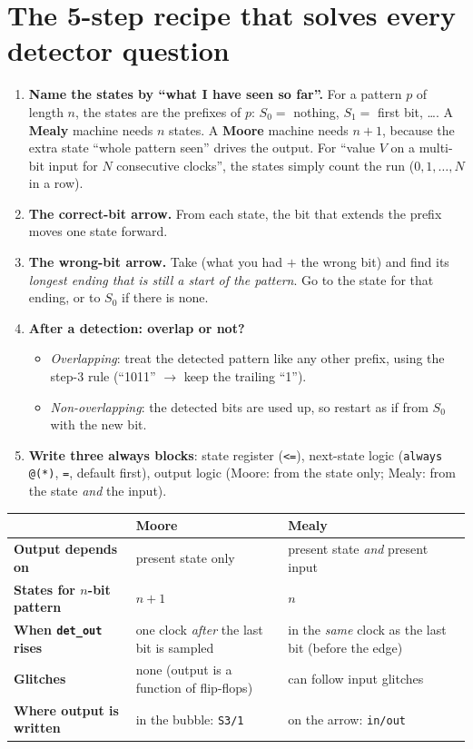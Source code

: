\documentclass[10pt,a4paper]{article}
\begin{document}
\section{The 5-step recipe that solves every detector question}
\begin{enumerate}[leftmargin=*,itemsep=2pt]
\item \textbf{Name the states by ``what I have seen so far''.} For a pattern $p$ of length $n$, the states are
  the prefixes of $p$: $S_0=$ nothing, $S_1=$ first bit, \dots. A \textbf{Mealy} machine needs $n$ states.
  A \textbf{Moore} machine needs $n+1$, because the extra state ``whole pattern seen'' drives the output.
  For ``value $V$ on a multi-bit input for $N$ consecutive clocks'', the states simply count the run
  ($0,1,\dots,N$ in a row).
\item \textbf{The correct-bit arrow.} From each state, the bit that extends the prefix moves one state forward.
\item \textbf{The wrong-bit arrow.} Take (what you had $+$ the wrong bit) and find its \emph{longest ending
  that is still a start of the pattern}. Go to the state for that ending, or to $S_0$ if there is none.
\item \textbf{After a detection: overlap or not?}
  \begin{itemize}[itemsep=0pt]
  \item \emph{Overlapping}: treat the detected pattern like any other prefix, using the step-3 rule
        (``1011'' $\to$ keep the trailing ``1'').
  \item \emph{Non-overlapping}: the detected bits are used up, so restart as if from $S_0$ with
        the new bit.
  \end{itemize}
\item \textbf{Write three always blocks}: state register (\texttt{<=}),
  next-state logic (\texttt{always @(*)}, \texttt{=}, default first),
  output logic (Moore: from the state only; Mealy: from the state \emph{and} the input).
\end{enumerate}

\begin{center}\small
\begin{tabular}{>{\bfseries}p{3.2cm} p{6.2cm} p{6.2cm}}
\toprule
 & Moore & Mealy \\ \midrule
Output depends on & present state only & present state \emph{and} present input \\
States for $n$-bit pattern & $n+1$ & $n$ \\
When \texttt{det\_out} rises & one clock \emph{after} the last bit is sampled & in the \emph{same} clock as the last bit (before the edge) \\
Glitches & none (output is a function of flip-flops) & can follow input glitches \\
Where output is written & in the bubble: \texttt{S3/1} & on the arrow: \texttt{in/out} \\
\bottomrule
\end{tabular}
\end{center}
\end{document}

